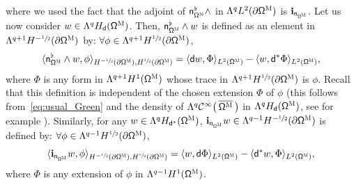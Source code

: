 \documentclass[JEP,XML,SOM,Unicode,NoEqCountersInSection,NoFloatCountersInSection,published]{cedram}
\let\pa\partial
\theoremstyle{plain}
\theoremstyle{definition}
\begin{document}
where we used the fact that the adjoint of $\mathsf n_{\mathsf \Omega^{\textsc{M}}}^\flat\wedge$ in $\Lambda^qL^2 (\pa \mathsf \Omega^{\textsc{M}})$ is $\mathbf i_{\mathsf n_{\mathsf \Omega^{\textsc{M}}}}$. Let us now consider $w \in \Lambda^q
H_{\mathsf d} (\mathsf \Omega^{\textsc{M}})$. Then, $\mathsf
n_{\mathsf \Omega^{\textsc{M}}}^\flat \wedge w$ is defined as an
element in $ \Lambda^{q+1} H^{-\sfrac12} (\pa\mathsf
\Omega^{\textsc{M}})$ by: $\forall \phi \in\Lambda^{q+1}H^{\sfrac12}
(\pa\mathsf \Omega^{\textsc{M}})$,
\begin{equation}
\label{eq.n-wedge-u}
\langle \mathsf n_{\mathsf \Omega^{\textsc{M}}}^\flat \wedge w, \phi \rangle_{H^{-\sfrac12} (\pa\mathsf \Omega^{\textsc{M}}),H^{\sfrac12} (\pa\mathsf \Omega^{\textsc{M}})} =
\langle \mathsf d w, \Phi \rangle_{ L^2 (\mathsf \Omega^{\textsc{M}})}-\langle w, \mathsf d^*\Phi\rangle_{ L^2 (\mathsf \Omega^{\textsc{M}})},
\end{equation}
where $\Phi$ is any form in $\Lambda^{q+1}H^{1} (\mathsf \Omega^{\textsc{M}})$ whose trace
in $\Lambda^{q+1}H^{\sfrac12} (\pa\mathsf \Omega^{\textsc{M}})$ is $\phi$. Recall that this definition is independent of the chosen extension $\Phi$ of $\phi$ (this follows from~\eqref{eq:usual_Green} and the density of $\Lambda^q\mathcal C^\infty\bigl(\, \overline{\mathsf \Omega^{\textsc{M}}}\, \bigr)$
in $\Lambda^q H_{\mathsf d} (\mathsf \Omega^{\textsc{M}})$, see
for example
\cite[Prop.\,3.1]{jakab-mitrea-mitrea-09}). Similarly, for any
$w \in \Lambda^q H_{\mathsf d^*} (\mathsf \Omega^{\textsc{M}})$,
$\mathbf{i}_{\mathsf n_{\mathsf \Omega^{\textsc{M}}}} w\in
\Lambda^{q-1}H^{-\sfrac12} (\pa\mathsf \Omega^{\textsc{M}})$
is defined by: $\forall \phi \in \Lambda^{q-1} H^{\sfrac12} (\pa\mathsf \Omega^{\textsc{M}})$,
\begin{equation}
\label{eq.i-n-u}
\langle \mathbf{i}_{\mathsf n_{\mathsf \Omega^{\textsc{M}}}} w, \phi \rangle_{H^{-\sfrac12} (\pa\mathsf \Omega^{\textsc{M}}),H^{\sfrac12} (\pa\mathsf \Omega^{\textsc{M}})} =
\langle w, \mathsf d\Phi\rangle_{ L^2 (\mathsf \Omega^{\textsc{M}})}-\langle \mathsf d^*w, \Phi\rangle_{ L^2 (\mathsf \Omega^{\textsc{M}})},
\end{equation}
where $\Phi$ is any extension of $\phi$ in $\Lambda^{q-1}H^{1} (\mathsf \Omega^{\textsc{M}})$.
\end{document}
